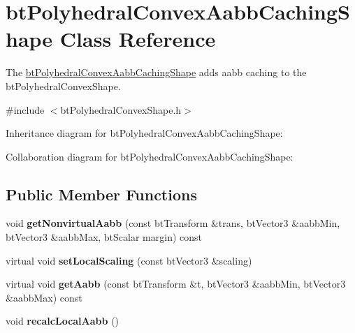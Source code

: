 \hypertarget{classbt_polyhedral_convex_aabb_caching_shape}{\section{bt\+Polyhedral\+Convex\+Aabb\+Caching\+Shape Class Reference}
\label{classbt_polyhedral_convex_aabb_caching_shape}
}


The \hyperlink{classbt_polyhedral_convex_aabb_caching_shape}{bt\+Polyhedral\+Convex\+Aabb\+Caching\+Shape} adds aabb caching to the bt\+Polyhedral\+Convex\+Shape.  




{\ttfamily \#include $<$bt\+Polyhedral\+Convex\+Shape.\+h$>$}



Inheritance diagram for bt\+Polyhedral\+Convex\+Aabb\+Caching\+Shape\+:


Collaboration diagram for bt\+Polyhedral\+Convex\+Aabb\+Caching\+Shape\+:
\subsection*{Public Member Functions}
\begin{DoxyCompactItemize}
\item 
\hypertarget{classbt_polyhedral_convex_aabb_caching_shape_af44214badd7b050758b1ea5878bfda9d}{void {\bfseries get\+Nonvirtual\+Aabb} (const bt\+Transform \&trans, bt\+Vector3 \&aabb\+Min, bt\+Vector3 \&aabb\+Max, bt\+Scalar margin) const }\label{classbt_polyhedral_convex_aabb_caching_shape_af44214badd7b050758b1ea5878bfda9d}

\item 
\hypertarget{classbt_polyhedral_convex_aabb_caching_shape_a7c49c07bfcc3fc094fc23abc28543b2c}{virtual void {\bfseries set\+Local\+Scaling} (const bt\+Vector3 \&scaling)}\label{classbt_polyhedral_convex_aabb_caching_shape_a7c49c07bfcc3fc094fc23abc28543b2c}

\item 
\hypertarget{classbt_polyhedral_convex_aabb_caching_shape_a2f42eab362004c333b71285e5b137519}{virtual void {\bfseries get\+Aabb} (const bt\+Transform \&t, bt\+Vector3 \&aabb\+Min, bt\+Vector3 \&aabb\+Max) const }\label{classbt_polyhedral_convex_aabb_caching_shape_a2f42eab362004c333b71285e5b137519}

\item 
\hypertarget{classbt_polyhedral_convex_aabb_caching_shape_a087f6944dc205a325e0d1e8f79968289}{void {\bfseries recalc\+Local\+Aabb} ()}\label{classbt_polyhedral_convex_aabb_caching_shape_a087f6944dc205a325e0d1e8f79968289}

\end{DoxyCompactItemize}
